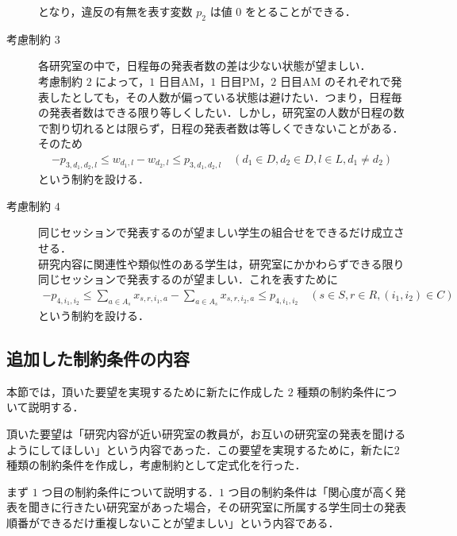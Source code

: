 \documentclass[a4paper,12pt,fleqn]{jarticle}
\begin{document}
\begin{description}
  となり，違反の有無を表す変数 $p_2$ は値 $0$ をとることができる．
\item[考慮制約 $3$] 各研究室の中で，日程毎の発表者数の差は少ない状態が望ましい．\\考慮制約 $2$ によって，$1$ 日目AM，$1$ 日目PM，$2$ 日目AM のそれぞれで発表したとしても，その人数が偏っている状態は避けたい．つまり，日程毎の発表者数はできる限り等しくしたい．しかし，研究室の人数が日程の数で割り切れるとは限らず，日程の発表者数は等しくできないことがある．そのため
  \begin{eqnarray}
    -p_{3,d_1,d_2,l} \leq w_{d_1,l} - w_{d_2,l} \leq p_{3,d_1,d_2,l} \quad (d_1 \in D, d_2 \in D, l \in L, d_1 \neq d_2)
  \end{eqnarray}
  という制約を設ける．
\item[考慮制約 $4$] 同じセッションで発表するのが望ましい学生の組合せをできるだけ成立させる．\\研究内容に関連性や類似性のある学生は，研究室にかかわらずできる限り同じセッションで発表するのが望ましい．これを表すために
  \begin{eqnarray}
    -p_{4,i_1,i_2} \leq \sum_{a \in A_s} x_{s,r,i_1,a} - \sum_{a \in A_s}x_{s,r,i_2,a} \leq p_{4,i_1,i_2} \quad (s \in S, r \in R, (i_1, i_2) \in C)
  \end{eqnarray}
  という制約を設ける．
    \end{description}

\subsection{追加した制約条件の内容}\label{sec:tuika}
本節では，頂いた要望を実現するために新たに作成した $2$ 種類の制約条件について説明する．

頂いた要望は「研究内容が近い研究室の教員が，お互いの研究室の発表を聞けるようにしてほしい」という内容であった．この要望を実現するために，新たに$2$ 種類の制約条件を作成し，考慮制約として定式化を行った．

まず $1$ つ目の制約条件について説明する．$1$ つ目の制約条件は「関心度が高く発表を聞きに行きたい研究室があった場合，その研究室に所属する学生同士の発表順番ができるだけ重複しないことが望ましい」という内容である．
\end{document}
